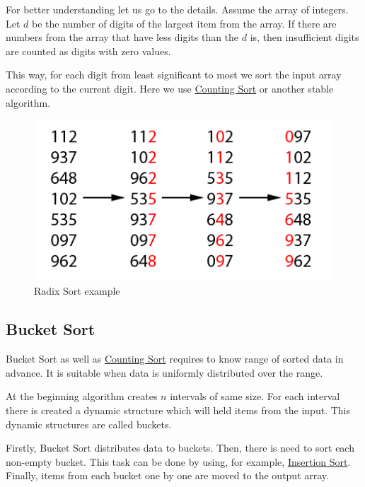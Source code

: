 \documentclass[
  field=inf,
  biblatex,
  language=english,
  glossaries,
  theorems=false,
  index
]{kidiplom}
\begin{document}
For better understanding let us go to the details. Assume the array of integers. Let $d$ be the number of digits of the largest item from the array. If there are numbers from the array that have less digits than the $d$ is, then insufficient digits are counted as digits with zero values.

This way, for each digit from least significant to most we sort the input array according to the current digit. Here we use \hyperref[sec:counting]{Counting Sort} or another stable algorithm.

\begin{figure}[H]
\begin{center}
	
	\includegraphics[scale=2]{img/Radixsort.png}
	\caption{Radix Sort example}\label{fig:radixsort}
\end{center}
\end{figure}

\subsection{Bucket Sort}

Bucket Sort as well as \hyperref[sec:counting]{Counting Sort} requires to know range of sorted data in advance. It is suitable when data is uniformly distributed over the range.

At the beginning algorithm creates $n$ intervals of same size. For each interval there is created a dynamic structure which will held items from the input. This dynamic structures are called buckets.

Firstly, Bucket Sort distributes data to buckets. Then, there is need to sort each non-empty bucket. This task can be done by using, for example, \hyperref[sec:insertion]{Insertion Sort}. Finally, items from each bucket one by one are moved to the output array.
\end{document}
